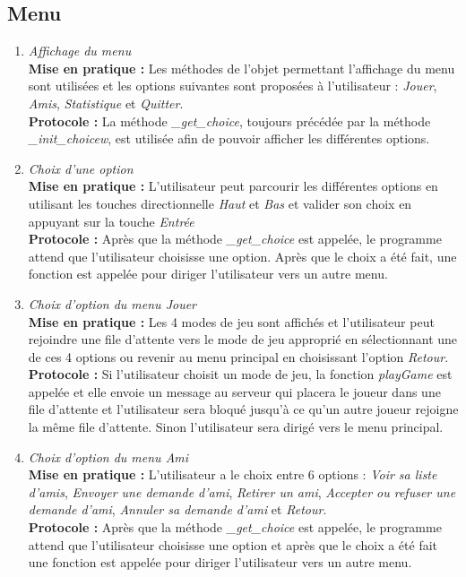 \documentclass[10pt, a4paper]{article}
\begin{document}
\subsection{Menu}
\begin{enumerate}

\item \textit{Affichage du menu}\\
\textbf{Mise en pratique :} Les méthodes de l'objet permettant l'affichage du menu sont utilisées et les options suivantes sont proposées à l'utilisateur : \textit{Jouer}, \textit{Amis}, \textit{Statistique} et \textit{Quitter}.\\
\textbf{Protocole :} La méthode \textit{\_get\_choice}, toujours précédée par la méthode \textit{\_init\_choicew}, est utilisée afin de pouvoir afficher les différentes options.

\item \textit{Choix d'une option}\\
\textbf{Mise en pratique :} L'utilisateur peut parcourir les différentes options en utilisant les touches directionnelle \textit{Haut} et \textit{Bas} et valider son choix en appuyant sur la touche \textit{Entrée} \\
\textbf{Protocole :} Après que la méthode \textit{\_get\_choice} est appelée, le programme attend que l'utilisateur choisisse une option. Après que le choix a été fait, une fonction est appelée pour diriger l'utilisateur vers un autre menu.

\item \textit{Choix d'option du menu Jouer}\\
\textbf{Mise en pratique :} Les 4 modes de jeu sont affichés et l'utilisateur peut rejoindre une file d'attente vers le mode de jeu approprié en sélectionnant une de ces 4 options ou revenir au menu principal en choisissant l'option \textit{Retour}.\\
\textbf{Protocole :} Si l'utilisateur choisit un mode de jeu, la fonction \textit{playGame} est appelée et elle envoie un message au serveur qui placera le joueur dans une file d'attente et l'utilisateur sera bloqué jusqu'à ce qu'un autre joueur rejoigne la même file d'attente. Sinon l'utilisateur sera dirigé vers le menu principal.

\item \textit{Choix d'option du menu Ami}\\
\textbf{Mise en pratique :} L'utilisateur a le choix entre 6 options : \textit{Voir sa liste d'amis}, \textit{Envoyer une demande d'ami}, \textit{Retirer un ami}, \textit{Accepter ou refuser une demande d'ami}, \textit{Annuler sa demande d'ami} et \textit{Retour}.\\
\textbf{Protocole :} Après que la méthode \textit{\_get\_choice} est appelée, le programme attend que l'utilisateur choisisse une option et après que le choix a été fait une fonction est appelée pour diriger l'utilisateur vers un autre menu. 


\end{enumerate}
\end{document}
